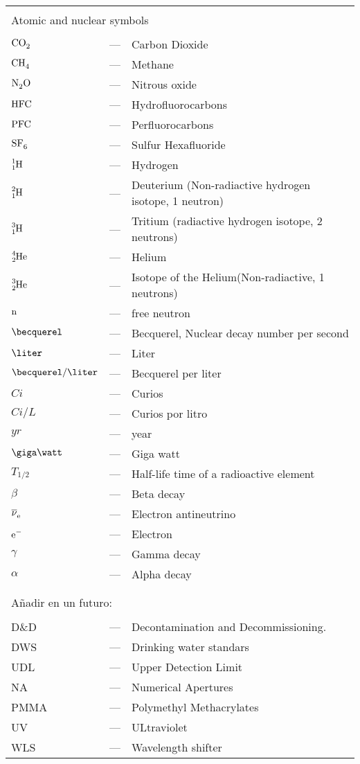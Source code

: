 \begin{longtable}{p{25mm} c p{120mm} }
\\
\\
\multicolumn{3}{l}{Atomic and nuclear symbols}\\
\\
$\ce{CO_2}$ & --- & Carbon Dioxide\\
$\ce{CH_4}$ & --- & Methane\\
$\ce{N_2 O}$ & --- & Nitrous oxide\\
$\ce{HFC}$ & --- & Hydrofluorocarbons\\
$\ce{PFC}$ & --- & Perfluorocarbons\\
$\ce{SF_6}$ & --- & Sulfur Hexafluoride\\
$\ce{^{1}_{1}H}$ & --- & Hydrogen\\
$\ce{^{2}_{1}H}$ & --- & Deuterium (Non-radiactive hydrogen isotope, 1 neutron)\\
$\ce{^{3}_{1}H}$ & --- & Tritium (radiactive hydrogen isotope, 2 neutrons)\\
$\ce{^{4}_{2}He}$ & --- & Helium\\
$\ce{^{3}_{2}He}$ & --- & Isotope of the Helium(Non-radiactive, 1 neutrons)\\
$\ce{n}$ & --- & free neutron\\
$\becquerel$ & --- & Becquerel, Nuclear decay number per second\\
$\liter$ & --- & Liter\\
$\becquerel/\liter$ & --- & Becquerel per liter\\
$Ci$ & --- & Curios\\
$Ci/L$ & --- & Curios por litro\\
$yr$ & --- & year\\
$\giga\watt$ & --- & Giga watt\\
$T_{1/2}$ & --- & Half-life time of a radioactive element\\
$\beta$ & --- & Beta decay\\
$\ce{\overline{\nu}_e}$ & --- & Electron antineutrino\\
$\ce{e^-}$ & --- & Electron\\



$\gamma$ & --- & Gamma decay\\
$\alpha$ & --- & Alpha decay\\
\\
\\
\multicolumn{3}{l}{Añadir en un futuro:}\\
\\
D\&D & --- & Decontamination and Decommissioning.\\
DWS & --- & Drinking water standars\\
UDL & --- & Upper Detection Limit\\


NA & --- & Numerical Apertures\\
PMMA & --- & Polymethyl Methacrylates\\
UV & --- & ULtraviolet\\
WLS & --- & Wavelength shifter\\
\end{longtable}
